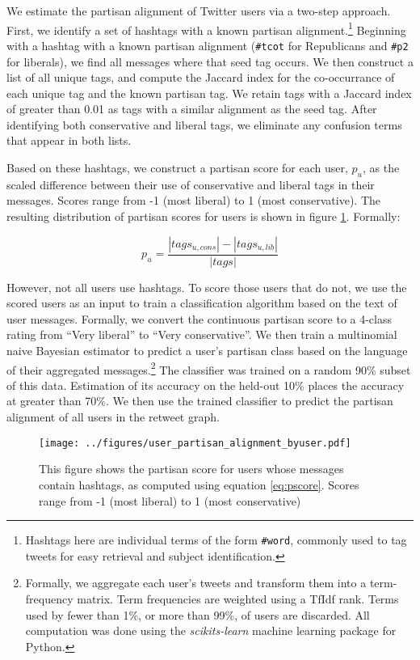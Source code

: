 \documentclass[11pt]{article}
\begin{document}
We estimate the partisan alignment of Twitter users via a two-step
approach. First, we identify a set of hashtags with a known partisan
alignment.\footnote{Hashtags here are individual terms of the form
  \texttt{\#word}, commonly used to tag tweets for easy retrieval and
  subject identification.} Beginning with a hashtag with a known
partisan alignment (\texttt{\#tcot} for Republicans and \texttt{\#p2}
for liberals), we find all messages where that seed tag occurs. We
then construct a list of all unique tags, and compute the Jaccard
index for the co-occurrance of each unique tag and the known partisan
tag. We retain tags with a Jaccard index of greater than 0.01 as tags
with a similar alignment as the seed tag. After identifying both
conservative and liberal tags, we eliminate any confusion terms that
appear in both lists. 

 Based on these hashtags, we construct a partisan score for each user,
 $p_u$, as the scaled difference between their use of conservative and
 liberal tags in their messages. Scores range from -1 (most liberal) to 1 (most conservative). The resulting distribution of partisan scores for users is shown in
figure \ref{fig:user-pscore}. Formally:

 \begin{equation}
   \label{eq:pscore}
   p_u = \frac{\left|tags_{u,cons}\right| - \left|tags_{u, lib}\right|}{\left|tags\right|}
 \end{equation}

However, not all users use hashtags. To
score those users that do not, we use the scored users as an input to
train a classification algorithm based on the text of user
messages. Formally, we convert the continuous partisan score to a
4-class rating from ``Very liberal'' to ``Very conservative''. We then
train a multinomial naive Bayesian estimator to predict a user's
partisan class based on the language of their aggregated
messages.\footnote{Formally, we aggregate each user's tweets and
  transform them into a term-frequency matrix. Term frequencies are
  weighted using a TfIdf rank. Terms used by fewer than 1\%, or
  more than 99\%, of users are discarded. All computation was done
  using the \textit{scikits-learn} machine learning package for Python.} The classifier was trained
on a random 90\% subset of this data. Estimation of its accuracy on
the held-out 10\% places the accuracy at greater than 70\%. We then
use the trained classifier to predict the partisan alignment of all
users in the retweet graph.

\begin{figure}[ht]
  \centering
  \texttt{[image: ../figures/user\_partisan\_alignment\_byuser.pdf]}
  \caption{This figure shows the partisan score for users whose
    messages contain hashtags, as computed using equation
    \ref{eq:pscore}. Scores range from -1 (most liberal) to 1 (most conservative)}
  \label{fig:user-pscore}
\end{figure}
\end{document}

